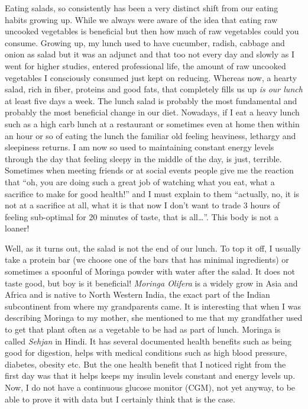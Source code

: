 \documentclass[
  oneside]{book}
\begin{document}
Eating salads, so consistently has been a very distinct shift from our eating habits growing up. While we always were aware of the idea that eating raw uncooked vegetables is beneficial but then how much of raw vegetables could you consume. Growing up, my lunch used to have cucumber, radish, cabbage and onion as salad but it was an adjunct and that too not every day and slowly as I went for higher studies, entered professional life, the amount of raw uncooked vegetables I consciously consumed just kept on reducing. Whereas now, a hearty salad, rich in fiber, proteins and good fats, that completely fills us up \emph{is our lunch} at least five days a week. The lunch salad is probably the most fundamental and probably the most beneficial change in our diet. Nowadays, if I eat a heavy lunch such as a high carb lunch at a restaurant or sometimes even at home then within an hour or so of eating the lunch the familiar old feeling heaviness, lethargy and sleepiness returns. I am now so used to maintaining constant energy levels through the day that feeling sleepy in the middle of the day, is just, terrible. Sometimes when meeting friends or at social events people give me the reaction that ``oh, you are doing such a great job of watching what you eat, what a sacrifice to make for good health!'' and I must explain to them ``actually, no, it is not at a sacrifice at all, what it is that now I don't want to trade 3 hours of feeling sub-optimal for 20 minutes of taste, that is all\ldots{}''. This body is not a loaner!

Well, as it turns out, the salad is not the end of our lunch. To top it off, I usually take a protein bar (we choose one of the bars that has minimal ingredients) or sometimes a spoonful of Moringa powder with water after the salad. It does not taste good, but boy is it beneficial! \emph{Moringa Olifera} is a widely grow in Asia and Africa and is native to North Western India, the exact part of the Indian subcontinent from where my grandparents came. It is interesting that when I was describing Moringa to my mother, she mentioned to me that my grandfather used to get that plant often as a vegetable to be had as part of lunch. Moringa is called \emph{Sehjan} in Hindi. It has several documented health benefits such as being good for digestion, helps with medical conditions such as high blood pressure, diabetes, obesity etc. But the one health benefit that I noticed right from the first day was that it helps keeps my insulin levels constant and energy levels up. Now, I do not have a continuous glucose monitor (CGM), not yet anyway, to be able to prove it with data but I certainly think that is the case.
\end{document}
